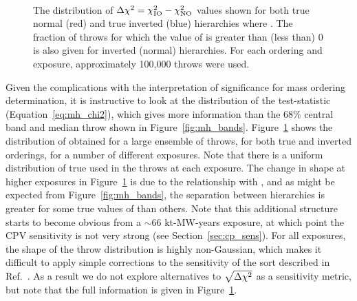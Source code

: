 \begin{figure*}[htbp]
  \centering
  \\
  \caption{The distribution of $\Delta\chi^{2} = \chi^{2}_{\mathrm{IO}} - \chi^{2}_{\mathrm{NO}}$ values shown for both true normal (red) and true inverted (blue) hierarchies where . The fraction of throws for which the value of \dchisq is greater than (less than) 0 is also given for inverted (normal) hierarchies. For each ordering and exposure, approximately 100,000 throws were used.}
  \label{fig:mh_comp_over_time}
\end{figure*}
Given the complications with the interpretation of significance for mass ordering determination, it is instructive to look at the distribution of the test-statistic (Equation~\ref{eq:mh_chi2}), which gives more information than the 68\% central band and median throw shown in Figure~\ref{fig:mh_bands}. Figure~\ref{fig:mh_comp_over_time} shows the distribution of \dchisq obtained for a large ensemble of throws, for both true and inverted orderings, for a number of different exposures. Note that there is a uniform distribution of true \deltacp used in the throws at each exposure. The change in shape at higher exposures in Figure~\ref{fig:mh_comp_over_time} is due to the relationship with \deltacp, and as might be expected from Figure~\ref{fig:mh_bands}, the separation between hierarchies is greater for some true values of \deltacp than others. Note that this additional structure starts to become obvious from a $\sim$66 kt-MW-years exposure, at which point the CPV sensitivity is not very strong (see Section~\ref{sec:cp_sens}). For all exposures, the shape of the throw distribution is highly non-Gaussian, which makes it difficult to apply simple corrections to the sensitivity of the sort described in Ref.~\cite{Blennow:2013oma}. As a result we do not explore alternatives to $\sqrt{\Delta\chi^{2}}$ as a sensitivity metric, but note that the full information is given in Figure~\ref{fig:mh_comp_over_time}.

